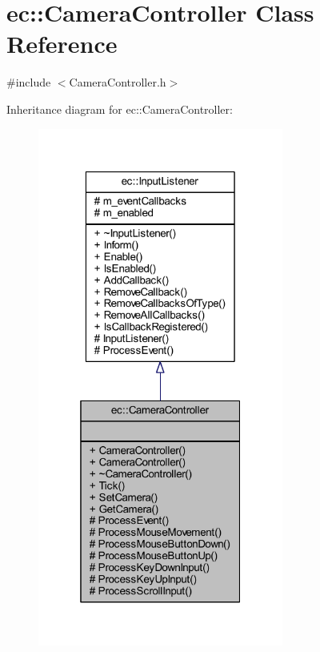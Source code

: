 \hypertarget{classec_1_1_camera_controller}{}\section{ec\+:\+:Camera\+Controller Class Reference}
\label{classec_1_1_camera_controller}


{\ttfamily \#include $<$Camera\+Controller.\+h$>$}



Inheritance diagram for ec\+:\+:Camera\+Controller\+:
\nopagebreak
\begin{figure}[H]
\begin{center}
\leavevmode
\includegraphics[width=229pt]{classec_1_1_camera_controller__inherit__graph}
\end{center}
\end{figure}


